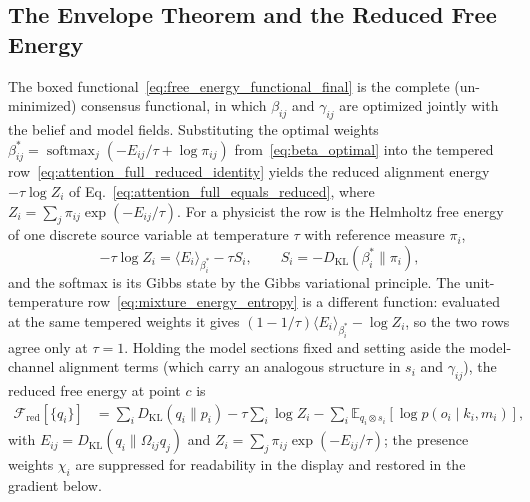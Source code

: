 \subsection{The Envelope Theorem and the Reduced Free Energy}
\label{sec:envelope_theorem}

The boxed functional~\eqref{eq:free_energy_functional_final} is the complete (un-minimized) consensus functional, in which $\beta_{ij}$ and $\gamma_{ij}$ are optimized jointly with the belief and model fields. Substituting the optimal weights $\beta_{ij}^* = \operatorname{softmax}_j(-E_{ij}/\tau + \log\pi_{ij})$ from~\eqref{eq:beta_optimal} into the tempered row~\eqref{eq:attention_full_reduced_identity} yields the reduced alignment energy $-\tau\log Z_i$ of Eq.~\eqref{eq:attention_full_equals_reduced}, where $Z_i = \sum_j \pi_{ij}\exp(-E_{ij}/\tau)$. For a physicist the row is the Helmholtz free energy of one discrete source variable at temperature $\tau$ with reference measure $\pi_i$,
\begin{equation}
-\tau\log Z_i = \langle E_i\rangle_{\beta_i^*} - \tau S_i,
\qquad
S_i = -D_{\mathrm{KL}}(\beta_i^*\|\pi_i),
\end{equation}
and the softmax is its Gibbs state by the Gibbs variational principle. The unit-temperature row~\eqref{eq:mixture_energy_entropy} is a different function: evaluated at the same tempered weights it gives $(1-1/\tau)\langle E_i\rangle_{\beta_i^*}-\log Z_i$, so the two rows agree only at $\tau=1$. Holding the model sections fixed and setting aside the model-channel alignment terms (which carry an analogous structure in $s_i$ and $\gamma_{ij}$), the reduced free energy at point $c$ is
\begin{equation}
\boxed{
\begin{aligned}
\mathcal{F}_{\mathrm{red}}[\{q_i\}]
&=\sum_i D_{\mathrm{KL}}(q_i\|p_i)
-\tau\sum_i \log Z_i
-\sum_i \mathbb{E}_{q_i\otimes s_i}[\log p(o_i\mid k_i,m_i)],
\end{aligned}
}
\label{eq:free_energy_reduced}
\end{equation}
with $E_{ij} = D_{\mathrm{KL}}(q_i \| \Omega_{ij} q_j)$ and $Z_i = \sum_j \pi_{ij} \exp(-E_{ij}/\tau)$; the presence weights $\chi_i$ are suppressed for readability in the display and restored in the gradient below.

